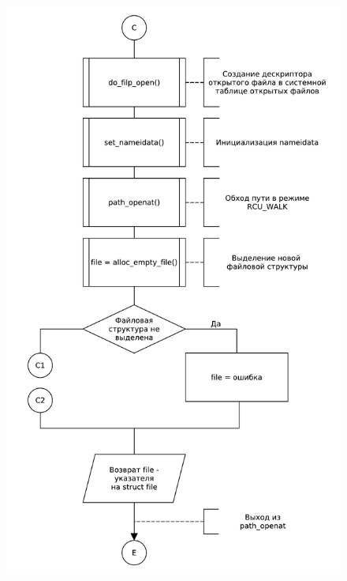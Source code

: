 \begin{figure}[H]
    \centering
    \caption{}
    \includegraphics[scale=0.5]{pdf/flowchart04.pdf}
\end{figure}
